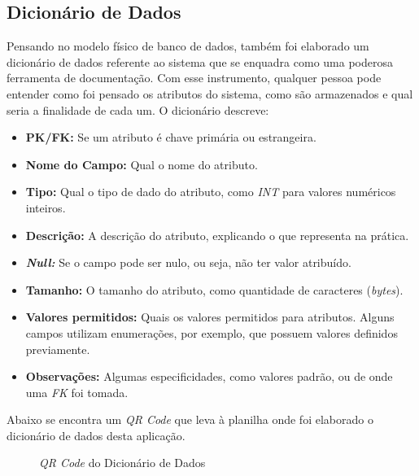 \subsection{Dicionário de Dados}
Pensando no modelo físico de banco de dados, também foi elaborado um dicionário de dados referente ao sistema que se enquadra como uma poderosa ferramenta de documentação. Com esse instrumento, qualquer pessoa pode entender como foi pensado os atributos do sistema, como são armazenados e qual seria a finalidade de cada um.
O dicionário descreve:
\begin{itemize}
	\item \textbf{PK/FK:} Se um atributo é chave primária ou estrangeira.
	\item \textbf{Nome do Campo:} Qual o nome do atributo.
	\item \textbf{Tipo:} Qual o tipo de dado do atributo, como \textit{INT} para valores numéricos inteiros.
	\item \textbf{Descrição:} A descrição do atributo, explicando o que representa na prática.
	\item \textbf{\textit{Null:}} Se o campo pode ser nulo, ou seja, não ter valor atribuído.
	\item \textbf{Tamanho:} O tamanho do atributo, como quantidade de caracteres (\textit{bytes}).
	\item \textbf{Valores permitidos:} Quais os valores permitidos para atributos. Alguns campos utilizam enumerações, por exemplo, que possuem valores definidos previamente.
	\item \textbf{Observações:} Algumas especificidades, como valores padrão, ou de onde uma \textit{FK} foi tomada.
\end{itemize}
Abaixo se encontra um \textit{QR Code} que leva à planilha onde foi elaborado o dicionário de dados desta aplicação.
\begin{figure}[h]
	\centering
	\caption{\emph{QR Code} do Dicionário de Dados}
	\label{fig:qrcode-dicionario-de-dados}
\end{figure}





